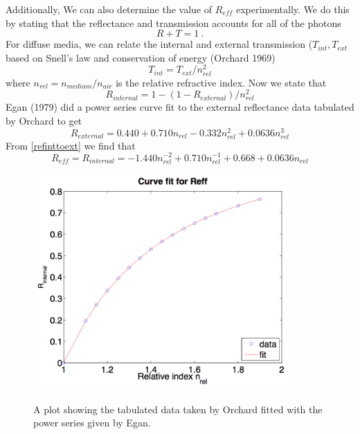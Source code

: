 \vspace{3mm}
Additionally, We can also determine the value of $R_{eff}$ experimentally. We do this by stating that the reflectance and transmission accounts for all of the photons
\begin{equation}
  R + T = 1 \ .
\end{equation}
For diffuse media, we can relate the internal and external transmission ($T_{int}, T_{ext}$ based on Snell's law and conservation of energy (Orchard 1969)
\begin{equation}
  T_{int} = T_{ext} /n_{rel}^2
\end{equation}
where $n_{rel} = n_{medium}/n_{air}$ is the relative refractive index. Now we state that
\begin{equation}
\label{refinttoext}
R_{internal} = 1 - (1 - R_{external})/n_{rel}^2
\end{equation}
Egan (1979) \cite{Egan1979} did a power series curve fit to the external reflectance data tabulated by Orchard \cite{Orchard1969} to get
\begin{equation}
R_{external} = 0.440 + 0.710n_{rel} -0.332n_{rel}^2 + 0.0636n_{rel}^3
\end{equation}
From \ref{refinttoext} we find that \cite{Sevick2002}
\begin{equation}
\label{exp eff}
R_{eff} = R_{internal} = -1.440n_{rel}^{-2} + 0.710n_{rel}^{-1} + 0.668 + 0.0636n_{rel}
\end{equation}
\begin{figure}[h]
\centering
\includegraphics[width=10cm]{./figures/2_Theory/ReflectanceCurveFit.png}
\label{ReflectanceCurveFit}
\caption{A plot showing the tabulated data taken by Orchard fitted with the power series given by Egan.} 
\end{figure}

